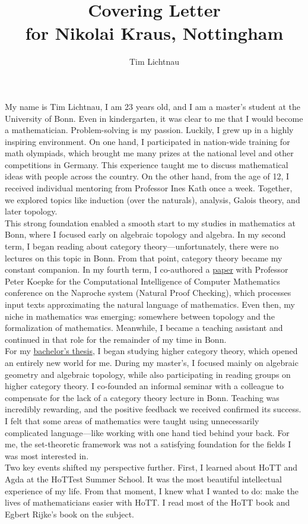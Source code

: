 \documentclass[12pt,headings=small,paper=A4,DIV=calc]{article}
\title{Covering Letter \\  for Nikolai Kraus, Nottingham}
\author{Tim Lichtnau}
\begin{document}
\maketitle
My name is Tim Lichtnau, I am 23 years old, and I am a master's student at the University of Bonn. Even in kindergarten, it was clear to me that I would become a mathematician. Problem-solving is my passion. Luckily, I grew up in a highly inspiring environment. On one hand, I participated in nation-wide training for math olympiads, which brought me many prizes at the national level and other competitions in Germany. This experience taught me to discuss mathematical ideas with people across the country. On the other hand, from the age of 12, I received individual mentoring from Professor Ines Kath once a week. Together, we explored topics like induction (over the naturals), analysis, Galois theory, and later topology. \\

This strong foundation enabled a smooth start to my studies in mathematics at Bonn, where I focused early on algebraic topology and algebra. In my second term, I began reading about category theory---unfortunately, there were no lectures on this topic in Bonn. From that point, category theory became my constant companion. In my fourth term, I co-authored a \href{https://ceur-ws.org/Vol-3377/natfom2.pdf}{paper} with Professor Peter Koepke for the Computational Intelligence of Computer Mathematics conference on the Naproche system (Natural Proof Checking), which processes input texts approximating the natural language of mathematics. Even then, my niche in mathematics was emerging: somewhere between topology and the formalization of mathematics. Meanwhile, I became a teaching assistant and continued in that role for the remainder of my time in Bonn. \\

For my \href{https://uni-bonn.sciebo.de/s/PJUqHE52SnCKJMy}{bachelor's thesis}, I began studying higher category theory, which opened an entirely new world for me. During my master's, I focused mainly on algebraic geometry and algebraic topology, while also participating in reading groups on higher category theory. I co-founded an informal seminar with a colleague to compensate for the lack of a category theory lecture in Bonn. Teaching was incredibly rewarding, and the positive feedback we received confirmed its success. \\
I felt that some areas of mathematics were taught using unnecessarily complicated language---like working with one hand tied behind your back. For me, the set-theoretic framework was not a satisfying foundation for the fields I was most interested in. \\
Two key events shifted my perspective further. First, I learned about HoTT and Agda at the HoTTest Summer School. It was the most beautiful intellectual experience of my life. From that moment, I knew what I wanted to do: make the lives of mathematicians easier with HoTT. I read most of the HoTT book and Egbert Rijke's book on the subject. \\
\end{document}
